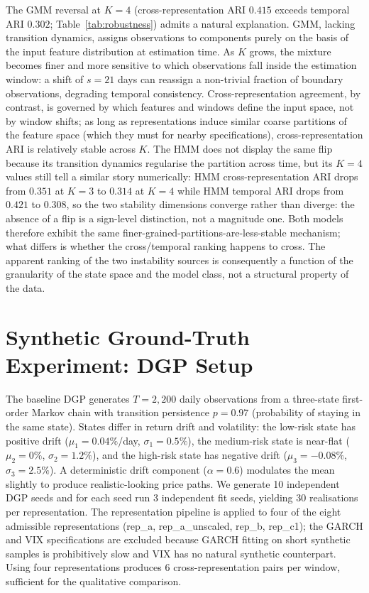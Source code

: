\documentclass[preprint,12pt,authoryear]{elsarticle}
\begin{document}
The GMM reversal at $K=4$ (cross-representation ARI $0.415$ exceeds temporal ARI $0.302$; Table~\ref{tab:robustness}) admits a natural explanation. GMM, lacking transition dynamics, assigns observations to components purely on the basis of the input feature distribution at estimation time. As $K$ grows, the mixture becomes finer and more sensitive to which observations fall inside the estimation window: a shift of $s=21$ days can reassign a non-trivial fraction of boundary observations, degrading temporal consistency. Cross-representation agreement, by contrast, is governed by which features and windows define the input space, not by window shifts; as long as representations induce similar coarse partitions of the feature space (which they must for nearby specifications), cross-representation ARI is relatively stable across $K$. The HMM does not display the same flip because its transition dynamics regularise the partition across time, but its $K=4$ values still tell a similar story numerically: HMM cross-representation ARI drops from $0.351$ at $K=3$ to $0.314$ at $K=4$ while HMM temporal ARI drops from $0.421$ to $0.308$, so the two stability dimensions converge rather than diverge: the absence of a flip is a sign-level distinction, not a magnitude one. Both models therefore exhibit the same finer-grained-partitions-are-less-stable mechanism; what differs is whether the cross/temporal ranking happens to cross. The apparent ranking of the two instability sources is consequently a function of the granularity of the state space and the model class, not a structural property of the data.

\section{Synthetic Ground-Truth Experiment: DGP Setup}
\label{app:synth_setup}

The baseline DGP generates $T=2{,}200$ daily observations from a three-state first-order Markov chain with transition persistence $p=0.97$ (probability of staying in the same state). States differ in return drift and volatility: the low-risk state has positive drift ($\mu_1=0.04\%$/day, $\sigma_1=0.5\%$), the medium-risk state is near-flat ($\mu_2=0\%$, $\sigma_2=1.2\%$), and the high-risk state has negative drift ($\mu_3=-0.08\%$, $\sigma_3=2.5\%$). A deterministic drift component ($\alpha=0.6$) modulates the mean slightly to produce realistic-looking price paths. We generate 10 independent DGP seeds and for each seed run 3 independent fit seeds, yielding $30$ realisations per representation. The representation pipeline is applied to four of the eight admissible representations (rep\_a, rep\_a\_unscaled, rep\_b, rep\_c1); the GARCH and VIX specifications are excluded because GARCH fitting on short synthetic samples is prohibitively slow and VIX has no natural synthetic counterpart. Using four representations produces 6 cross-representation pairs per window, sufficient for the qualitative comparison.
\end{document}
